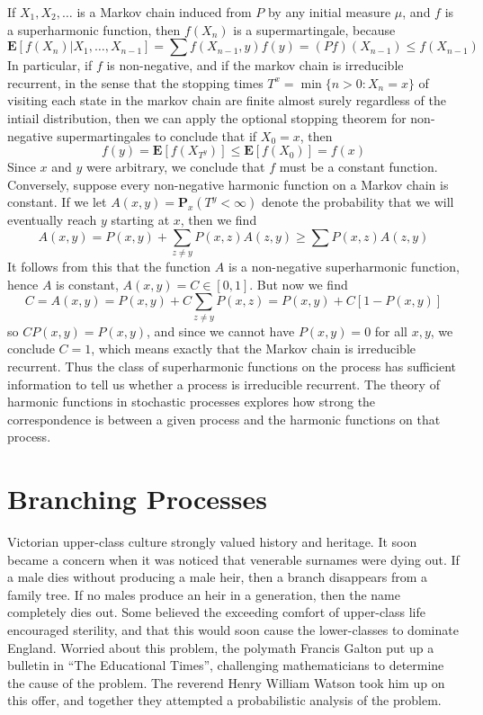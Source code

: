 If $X_1, X_2, \dots$ is a Markov chain induced from $P$ by any initial measure $\mu$, and $f$ is a superharmonic function, then $f(X_n)$ is a supermartingale, because
%
\[ \mathbf{E}[f(X_n)|X_1, \dots, X_{n-1}] = \sum f(X_{n-1},y) f(y) = (Pf)(X_{n-1}) \leq f(X_{n-1}) \]
%
In particular, if $f$ is non-negative, and if the markov chain is irreducible recurrent, in the sense that the stopping times $T^x = \min \{ n > 0: X_n = x \}$ of visiting each state in the markov chain are finite almost surely regardless of the intiail distribution, then we can apply the optional stopping theorem for non-negative supermartingales to conclude that if $X_0 = x$, then
%
\[ f(y) = \mathbf{E}[f(X_{T^y})] \leq \mathbf{E}[f(X_0)] = f(x) \]
%
Since $x$ and $y$ were arbitrary, we conclude that $f$ must be a constant function. Conversely, suppose every non-negative harmonic function on a Markov chain is constant. If we let $A(x,y) = \mathbf{P}_x(T^y < \infty)$ denote the probability that we will eventually reach $y$ starting at $x$, then we find
%
\[ A(x,y) = P(x,y) + \sum_{z \neq y} P(x,z) A(z,y) \geq \sum P(x,z) A(z,y) \]
%
It follows from this that the function $A$ is a non-negative superharmonic function, hence $A$ is constant, $A(x,y) = C \in [0,1]$. But now we find
%
\[ C = A(x,y) = P(x,y) + C \sum_{z \neq y} P(x,z) = P(x,y) + C[1 - P(x,y)] \]
%
so $C P(x,y) = P(x,y)$, and since we cannot have $P(x,y) = 0$ for all $x,y$, we conclude $C = 1$, which means exactly that the Markov chain is irreducible recurrent. Thus the class of superharmonic functions on the process has sufficient information to tell us whether a process is irreducible recurrent. The theory of harmonic functions in stochastic processes explores how strong the correspondence is between a given process and the harmonic functions on that process.

\chapter{Branching Processes}

Victorian upper-class culture strongly valued history and heritage. It soon became a concern when it was noticed that venerable surnames were dying out. If a male dies without producing a male heir, then a branch disappears from a family tree. If no males produce an heir in a generation, then the name completely dies out. Some believed the exceeding comfort of upper-class life encouraged sterility, and that this would soon cause the lower-classes to dominate England. Worried about this problem, the polymath Francis Galton put up a bulletin in ``The Educational Times'', challenging mathematicians to determine the cause of the problem. The reverend Henry William Watson took him up on this offer, and together they attempted a probabilistic analysis of the problem.

